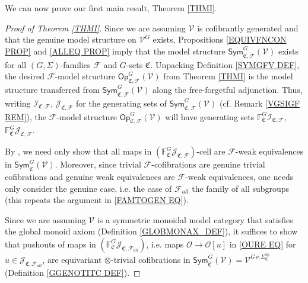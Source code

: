 \documentclass[a4paper,10pt
]{article}%
\numberwithin{equation}{section}
\numberwithin{figure}{section}
\theoremstyle{definition} %
\newcommand{\Sym}{\ensuremath{\mathsf{Sym}}}%
\newcommand{\Op}{\mathsf{Op}}%
\newcommand{\F}{\ensuremath{\mathcal F}}
\newcommand{\V}{\ensuremath{\mathcal V}}
\renewcommand{\O}{\ensuremath{\mathcal O}}
\newcommand{\1}{\ensuremath{\mathbbm 1}}%
\begin{document}
We can now prove our first main result, Theorem \ref{THMI}.


\begin{proof}[Proof of Theorem \ref{THMI}]    
        Since we are assuming $\V$ is cofibrantly generated and that the genuine model structure on $\V^G$ exists,
        Propositions \ref{EQUIVFNCON PROP} and \ref{ALLEQ PROP}
        imply that the model structure
        $\Sym_{\mathfrak C, \F}^G(\V)$ exists for all $(G, \Sigma)$-families $\F$ and $G$-sets $\mathfrak C$.
        Unpacking Definition \ref{SYMGFV DEF}, the desired $\F$-model structure $\Op_{\mathfrak C, \F}^G(\V)$ from Theorem \ref{THMI}
        is the model structure transferred from $\Sym_{\mathfrak C, \F}^G(\V)$ along the free-forgetful adjunction.
        Thus, 
        writing
	$\mathcal{I}_{\mathfrak{C},\mathcal{F}}$,
	$\mathcal{J}_{\mathfrak{C},\mathcal{F}}$
	for the generating sets of
        $\mathsf{Sym}^G_{\mathfrak C, \F}(\V)$
	(cf. Remark \ref{VGSIGF REM}),
        the $\F$-model structure $\mathsf{Op}^G_{\mathfrak C, \F}(\V)$
	will have generating sets 
	$\mathbb{F}^G_{\mathfrak{C}}\mathcal{I}_{\mathfrak{C},\mathcal{F}}$,
	$\mathbb{F}^G_{\mathfrak{C}}\mathcal{J}_{\mathfrak{C},\mathcal{F}}$.
	
	By \cite[Thm. 11.3.2]{Hir03},
	we need only show that all maps in
	$(\mathbb{F}^G_{\mathfrak{C}}\mathcal{J}_{\mathfrak{C},\mathcal{F}})$-cell
	are $\F$-weak equivalences in $\mathsf{Sym}^G_{\mathfrak{C}}(\V)$.
	Moreover, since trivial $\F$-cofibrations are genuine trivial cofibrations and 
	genuine weak equivalences are $\F$-weak equivalences, one needs only consider the genuine case, i.e. the case of $\F_{all}$ the family of all subgroups (this repeats the argument in \eqref{FAMTOGEN EQ}).
	
	
	Since we are assuming $\V$ is a symmetric monoidal model category that satisfies the global monoid axiom (Definition \ref{GLOBMONAX_DEF}),
	it suffices to show that pushouts of maps in 
	$(\mathbb{F}^G_{\mathfrak{C}}\mathcal{J}_{\mathfrak{C},\mathcal{F}_{all}})$,
	i.e. maps $\O \to \O[u]$ in \eqref{OURE EQ}
	for $u \in \mathcal{J}_{\mathfrak{C},\mathcal{F}_{all}}$,
	are equivariant $\otimes$-trivial cofibrations
	in $\mathsf{Sym}^G_{\mathfrak{C}}(\V) = \V^{G \ltimes \Sigma^{op}_{\mathfrak{C}}}$ (Definition \ref{GGENOTITC DEF}).
	
	
	

\end{proof}
\end{document}
